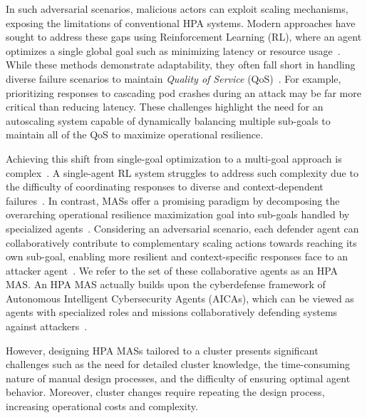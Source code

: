 \documentclass[conference]{IEEEtran}
\begin{document}
In such adversarial scenarios, malicious actors can exploit scaling mechanisms, exposing the limitations of conventional HPA systems. Modern approaches have sought to address these gaps using Reinforcement Learning (RL), where an agent optimizes a single global goal such as minimizing latency or resource usage~\cite{Gari2021}. While these methods demonstrate adaptability, they often fall short in handling diverse failure scenarios to maintain \textit{Quality of Service} (QoS)~\cite{Liu2024}. For example, prioritizing responses to cascading pod crashes during an attack may be far more critical than reducing latency. These challenges highlight the need for an autoscaling system capable of dynamically balancing multiple sub-goals to maintain all of the QoS to maximize operational resilience.

Achieving this shift from single-goal optimization to a multi-goal approach is complex~\cite{Shoham2009MAS}. A single-agent RL system struggles to address such complexity due to the difficulty of coordinating responses to diverse and context-dependent failures~\cite{Jennings1998}. In contrast, MASs offer a promising paradigm by decomposing the overarching operational resilience maximization goal into sub-goals handled by specialized agents~\cite{Shoham2009MAS}. Considering an adversarial scenario, each defender agent can collaboratively contribute to complementary scaling actions towards reaching its own sub-goal, enabling more resilient and context-specific responses face to an attacker agent~\cite{Jennings1998}. We refer to the set of these collaborative agents as an HPA MAS. An HPA MAS actually builds upon the cyberdefense framework of Autonomous Intelligent Cybersecurity Agents (AICAs), which can be viewed as agents with specialized roles and missions collaboratively defending systems against attackers~\cite{Kott2018}.

However, designing HPA MASs tailored to a cluster presents significant challenges such as the need for detailed cluster knowledge, the time-consuming nature of manual design processes, and the difficulty of ensuring optimal agent behavior. Moreover, cluster changes require repeating the design process, increasing operational costs and complexity.
\end{document}
